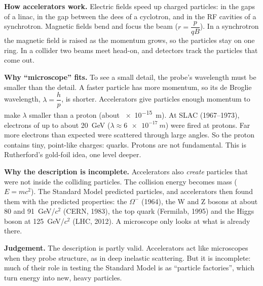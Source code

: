 \begin{practiceanswers}
\begin{practiceans}
  \begin{modelanswer}
  \textbf{How accelerators work.} Electric fields speed up charged particles: in the gaps
  of a linac, in the gap between the dees of a cyclotron, and in the RF cavities of a
  synchrotron. Magnetic fields bend and focus the beam ($r = \dfrac{p}{qB}$). In a
  synchrotron the magnetic field is raised as the momentum grows, so the particles stay on
  one ring. In a collider two beams meet head-on, and detectors track the particles that
  come out.

  \textbf{Why ``microscope'' fits.} To see a small detail, the probe's wavelength must be
  smaller than the detail. A faster particle has more momentum, so its de Broglie wavelength,
  $\lambda = \dfrac{h}{p}$, is shorter. Accelerators give particles enough momentum to make
  $\lambda$ smaller than a proton (about \qty{e-15}{m}). At SLAC (1967--1973), electrons of up
  to about \qty{20}{GeV} ($\lambda \approx \qty{6e-17}{m}$) were fired at protons. Far more
  electrons than expected were scattered through large angles. So the proton contains tiny,
  point-like charges: quarks. Protons are not fundamental. This is Rutherford's gold-foil
  idea, one level deeper.

  \textbf{Why the description is incomplete.} Accelerators also \emph{create} particles that
  were not inside the colliding particles. The collision energy becomes mass ($E = mc^2$).
  The Standard Model predicted particles, and accelerators then found them with the
  predicted properties: the $\Omega^-$ (1964), the W and Z bosons at about 80 and
  \qty{91}{GeV}/$c^2$ (CERN, 1983), the top quark (Fermilab, 1995) and the Higgs boson at
  \qty{125}{GeV}/$c^2$ (LHC, 2012). A microscope only looks at what is already there.

  \textbf{Judgement.} The description is partly valid. Accelerators act like microscopes when
  they probe structure, as in deep inelastic scattering. But it is incomplete: much of their
  role in testing the Standard Model is as ``particle factories'', which turn energy into
  new, heavy particles.
  \end{modelanswer}
  \begin{markingcriteria}
  \end{markingcriteria}
\end{practiceans}


\end{practiceanswers}
